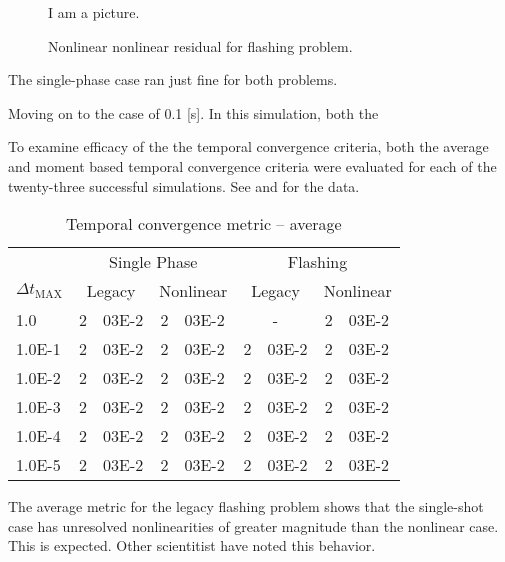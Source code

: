 \begin{figure}[h!t]
\begin{center}
I am a picture.
\end{center}
\caption{Nonlinear \cobra{} nonlinear residual for flashing problem.}
\label{fig:nonlinear_flashing_residual}
\end{figure}

The single-phase case ran just fine for both problems.

Moving on to the case of 0.1 [s].
In this simulation, both the

To examine efficacy of the the temporal convergence criteria, both the average and moment based temporal convergence criteria were evaluated for each of the twenty-three successful simulations.
See  and  for the data.

\begin{table}[h!t]
\centering
\begin{tabular}{@{}l r@{.}l r@{.}l r@{.}l r@{.}l @{}}
\toprule
& \multicolumn{4}{c}{Single Phase} & \multicolumn{4}{c}{Flashing}  \\
$\Delta t_{\text{MAX}}$ & \multicolumn{2}{c}{Legacy} & \multicolumn{2}{c}{Nonlinear} & \multicolumn{2}{c}{Legacy}& \multicolumn{2}{c}{Nonlinear}  \\
\midrule
1.0    & 2&03E-2 & 2&03E-2 & \multicolumn{2}{c}{-} & 2&03E-2 \\
1.0E-1 & 2&03E-2 & 2&03E-2 & 2&03E-2 & 2&03E-2 \\
1.0E-2 & 2&03E-2 & 2&03E-2 & 2&03E-2 & 2&03E-2 \\
1.0E-3 & 2&03E-2 & 2&03E-2 & 2&03E-2 & 2&03E-2 \\
1.0E-4 & 2&03E-2 & 2&03E-2 & 2&03E-2 & 2&03E-2 \\
1.0E-5 & 2&03E-2 & 2&03E-2 & 2&03E-2 & 2&03E-2 \\
\bottomrule  
\end{tabular}
\caption{Temporal convergence metric -- average}
\label{tab:criteria_ave}
\end{table}

The average metric for the legacy flashing problem shows that the single-shot case has unresolved nonlinearities of greater magnitude than the nonlinear case.
This is expected.
Other scientitist have noted this behavior.


